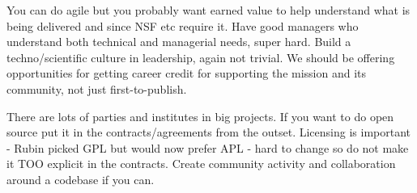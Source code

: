 \documentclass[11pt,twoside]{article}
\begin{document}
You can do agile but you probably want earned value \citep{2014SPIE.9150E..1EG,2016SPIE.9911E..0NK} to help understand what is being delivered and since NSF etc require it.
Have good managers who understand both technical and managerial needs, super hard.
Build a techno/scientific  culture in leadership, again not trivial.
We should be offering opportunities for getting career credit for supporting the mission and its community, not just first-to-publish.

There are lots of parties and institutes in big projects.
If you want to do open source put it in the contracts/agreements from the outset.
Licensing is important - Rubin picked GPL but would now prefer APL - hard to change
so do not make it TOO explicit in the contracts.
Create community activity and collaboration around a codebase if you can.





\end{document}
